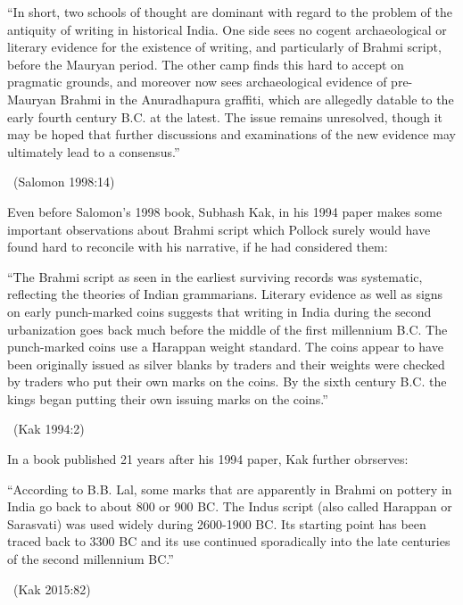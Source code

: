 \begin{myquote}
“In short, two schools of thought are dominant with regard to the problem of the antiquity of writing in historical India. One side sees no cogent archaeological or literary evidence for the existence of writing, and particularly of Brahmi script, before the Mauryan period. The other camp finds this hard to accept on pragmatic grounds, and moreover now sees archaeological evidence of pre-Mauryan Brahmi in the Anuradhapura graffiti, which are allegedly datable to the early fourth century B.C. at the latest. The issue remains unresolved, though it may be hoped that further discussions and examinations of the new evidence may ultimately lead to a consensus.” 

\vskip -5pt

~\hfill (Salomon 1998:14)
\end{myquote}

Even before Salomon’s 1998 book, Subhash Kak, in his 1994 paper makes some important observations about Brahmi script which Pollock surely would have found hard to reconcile with his narrative, if he had considered them:

\begin{myquote}
“The Brahmi script as seen in the earliest surviving records was systematic, reflecting the theories of Indian grammarians. Literary evidence as well as signs on early punch-marked coins suggests that writing in India during the second urbanization goes back much before the middle of the first millennium B.C. The punch-marked coins use a Harappan weight standard. The coins appear to have been originally issued as silver blanks by traders and their weights were checked by traders who put their own marks on the coins. By the sixth century B.C. the kings began putting their own issuing marks on the coins.” 

~\hfill (Kak 1994:2)
\end{myquote}

In a book published 21 years after his 1994 paper, Kak further obrserves:

\begin{myquote}
“According to B.B. Lal, some marks that are apparently in Brahmi on pottery in India go back to about 800 or 900 BC. The Indus script (also called Harappan or Sarasvati) was used widely during 2600-1900 BC. Its starting point has been traced back to 3300 BC and its use continued sporadically into the late centuries of the second millennium BC.” 

~\hfill (Kak 2015:82)
\end{myquote}

